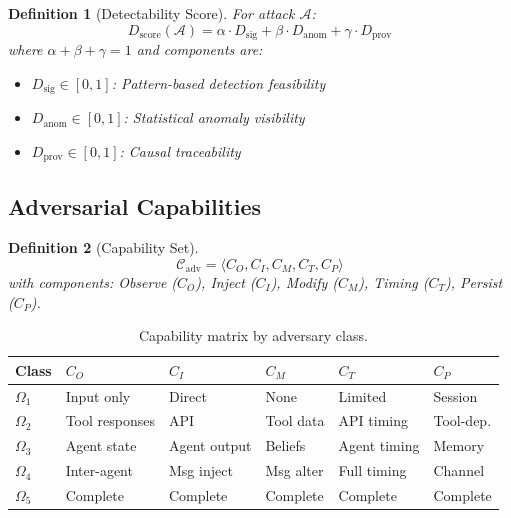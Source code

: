 \documentclass[
]{article}
\newtheorem{definition}{Definition}[section]
\begin{document}
\begin{definition}[Detectability Score]
\label{def:detectability}
For attack $\mathcal{A}$:
\begin{equation}
\label{eq:detectability}
D_{\text{score}}(\mathcal{A}) = \alpha \cdot D_{\text{sig}} + \beta \cdot D_{\text{anom}} + \gamma \cdot D_{\text{prov}}
\end{equation}
where $\alpha + \beta + \gamma = 1$ and components are:
\begin{itemize}
\item $D_{\text{sig}} \in [0,1]$: Pattern-based detection feasibility
\item $D_{\text{anom}} \in [0,1]$: Statistical anomaly visibility
\item $D_{\text{prov}} \in [0,1]$: Causal traceability
\end{itemize}
\end{definition}

\subsection{Adversarial Capabilities}\label{sec:capabilities}

\begin{definition}[Capability Set]
\label{def:capability-set}
\begin{equation}
\label{eq:capability-set}
\mathcal{C}_{\text{adv}} = \langle C_O, C_I, C_M, C_T, C_P \rangle
\end{equation}
with components: Observe ($C_O$), Inject ($C_I$), Modify ($C_M$), Timing ($C_T$), Persist ($C_P$).
\end{definition}

\begin{table}[htbp]
\centering
\caption{Capability matrix by adversary class.}
\label{tab:capability-matrix}
\begin{tabular}{@{}llllll@{}}
\toprule
Class & $C_O$ & $C_I$ & $C_M$ & $C_T$ & $C_P$ \\
\midrule
$\Omega_1$ & Input only & Direct & None & Limited & Session \\
$\Omega_2$ & Tool responses & API & Tool data & API timing & Tool-dep. \\
$\Omega_3$ & Agent state & Agent output & Beliefs & Agent timing & Memory \\
$\Omega_4$ & Inter-agent & Msg inject & Msg alter & Full timing & Channel \\
$\Omega_5$ & Complete & Complete & Complete & Complete & Complete \\
\bottomrule
\end{tabular}
\end{table}
\end{document}
